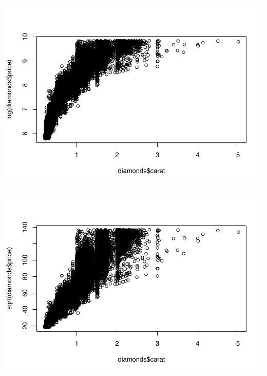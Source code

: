 \documentclass[
]{book}
\newenvironment{Shaded}{\begin{snugshade}}{\end{snugshade}}
\newcommand{\FunctionTok}[1]{\textcolor[rgb]{0.00,0.00,0.00}{#1}}
\newcommand{\NormalTok}[1]{#1}
\newcommand{\SpecialCharTok}[1]{\textcolor[rgb]{0.00,0.00,0.00}{#1}}
\begin{document}
\includegraphics{13-MultipleLinearRegression_files/figure-latex/unnamed-chunk-3-2.pdf}

\begin{Shaded}
\end{Shaded}

\includegraphics{13-MultipleLinearRegression_files/figure-latex/unnamed-chunk-3-3.pdf}

\begin{Shaded}
\end{Shaded}
\end{document}
